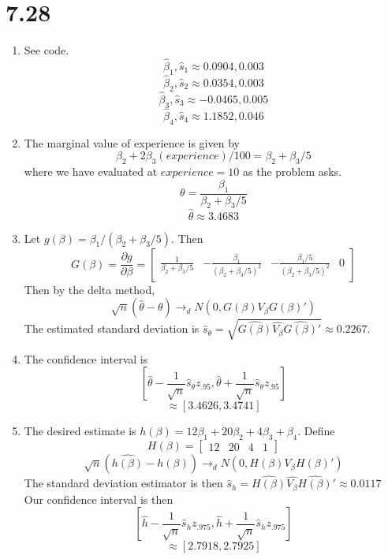 \documentclass[10pt,letter]{article}
\begin{document}
\section*{7.28}
\begin{enumerate}[label=(\alph*)]
  \item See code.
  \[ \hat {\beta}_1, \hat{s}_1 \approx 0.0904, 0.003  \]
  \[ \hat{\beta}_2, \hat{s}_2 \approx 0.0354, 0.003  \]
  \[ \hat{\beta}_3, \hat{s}_3 \approx -0.0465, 0.005 \]
  \[ \hat{\beta}_4, \hat{s}_4 \approx 1.1852, 0.046 \]
  \item
  The marginal value of experience is given by
  \[ \beta_2 + 2\beta_3 (experience)/100  = \beta_2 + \beta_3/5 \]
  where we have evaluated at $experience = 10$ as the problem asks.
  \[ \theta = \frac{\beta_1}{\beta_2 + \beta_3/5} \]
  \[ \hat{\theta} \approx 3.4683 \]
  \item Let $g(\beta) = \beta_1 / (\beta_2 + \beta_3/5)$. Then
  \[ G(\beta) = \frac{\partial g}{\partial \beta} = \begin{bmatrix} \frac{1}{\beta_2 + \beta_3/5} & -\frac{\beta_1}{(\beta_2 + \beta_3/5)^2} & -\frac{\beta_1/5}{(\beta_2 + \beta_3/5)^2} & 0  \end{bmatrix}  \]
  Then by the delta method,
  \[ \sqrt{n}(\hat{\theta} - \theta) \to_d N(0, G(\beta)V_\beta G(\beta)') \]
  The estimated standard deviation is $\hat{s}_\theta = \sqrt{\widehat{G(\beta)}\widehat{V_\beta} \widehat{G(\beta)}'} \approx 0.2267$.
  \item The confidence interval is
  \[ \left[ \hat{\theta} - \frac{1}{\sqrt{n}}\hat{s}_\theta z_{.95} , \hat{\theta} + \frac{1}{\sqrt{n}}\hat{s}_\theta z_{.95}  \right] \]
  \[ \approx [3.4626, 3.4741] \]
  \item The desired estimate is $h(\beta) = 12\beta_1 + 20 \beta_2 + 4 \beta_3 + \beta_4$. Define
  \[ H(\beta) = \begin{bmatrix} 12 & 20 & 4 & 1\end{bmatrix} \]
  \[ \sqrt{n}(\widehat{h(\beta)} - h(\beta)) \to_d N(0, H(\beta)V_\beta H(\beta)')\]
  The standard deviation estimator is then $\hat{s}_h = \widehat{H(\beta)}\widehat{V_\beta}\widehat{H(\beta)}' \approx 0.0117$
  Our confidence interval is then
  \[ \left[ \hat{h} - \frac{1}{\sqrt{n}}\hat{s}_h z_{.975} , \hat{h} + \frac{1}{\sqrt{n}}\hat{s}_h z_{.975}  \right] \]
  \[ \approx [2.7918, 2.7925] \]
\end{enumerate}
\end{document}
